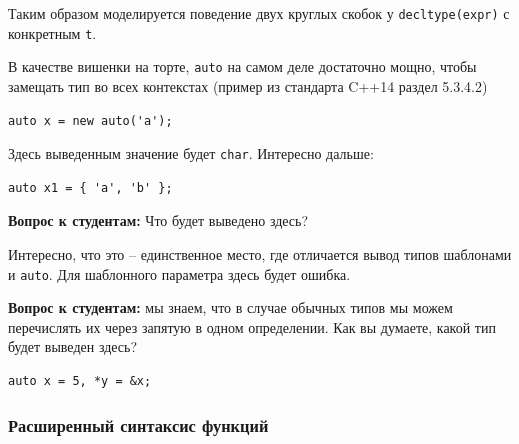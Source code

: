 \documentclass[a4paper,12pt,oneside]{article}
\newif\ifanswers
\begin{document}
Таким образом моделируется поведение двух круглых скобок у \lstinline!decltype(expr)! с конкретным \lstinline!t!.

В качестве вишенки на торте, \lstinline!auto! на самом деле достаточно мощно, чтобы замещать тип во всех контекстах (пример из стандарта C++14 раздел 5.3.4.2)

\begin{lstlisting}
auto x = new auto('a');
\end{lstlisting}

Здесь выведенным значение будет \lstinline!char!. Интересно дальше:

\begin{lstlisting}
auto x1 = { 'a', 'b' };
\end{lstlisting}

\textbf{Вопрос к студентам:} Что будет выведено здесь? 

\ifanswers
Это довольно хитрый вопрос. Ответ ``массив'' неверный. В реальности будет выведен \lstinline!std::initializer_list<char>! -- тот самый новый тип, который позволил так лихо инициализировать вектор в самом начале.
\fi

Интересно, что это -- единственное место, где отличается вывод типов шаблонами и \lstinline!auto!. Для шаблонного параметра здесь будет ошибка.

\textbf{Вопрос к студентам:} мы знаем, что в случае обычных типов мы можем перечислять их через запятую в одном определении. Как вы думаете, какой тип будет выведен здесь?

\begin{lstlisting}
auto x = 5, *y = &x;
\end{lstlisting}

\ifanswers
Вопрос несколько более простодушен. Правильный ответ: увы, это ошибка. Это, правда, создает некоторые проблемы. Неясно почему вот так можно:

\begin{lstlisting}
auto x = 1; 
auto y = 1.0;
\end{lstlisting}

А вот так нельзя:

\begin{lstlisting}
auto x = 1, y = 1.0; /* ! */
\end{lstlisting}

Написано-то как бы одно и то же. Ждем исправления этого в C++17 или более поздних. С другой стороны, жить это не мешает.
\fi

\subsubsection{Расширенный синтаксис функций}\label{DeclFunctions}
\end{document}

